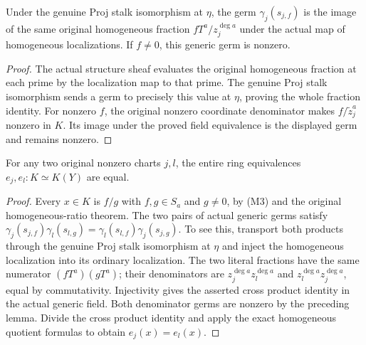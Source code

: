 \begin{lemma}
\label{lem:seven-native-original-homogeneous-stalk}
\leanok
Under the genuine Proj stalk isomorphism at $\eta$, the germ
$\gamma_j(s_{j,f})$ is the image of the same original homogeneous fraction
$fT^a/z_j^{\deg a}$ under the actual map of homogeneous localizations.
If $f\ne0$, this generic germ is nonzero.
\end{lemma}
\begin{proof}
The actual structure sheaf evaluates the original homogeneous fraction at
each prime by the localization map to that prime. The genuine Proj stalk
isomorphism sends a germ to precisely this value at $\eta$, proving the
whole fraction identity. For nonzero $f$, the original nonzero coordinate
denominator makes $f/\widetilde z_j^a$ nonzero in $K$. Its image under the
proved field equivalence is the displayed germ and remains nonzero.
\end{proof}

\begin{theorem}
\label{thm:seven-native-original-field-independent}
\leanok
For any two original nonzero charts $j,l$, the entire ring equivalences
$e_j,e_l:K\simeq K(Y)$ are equal.
\end{theorem}
\begin{proof}
Every $x\in K$ is $f/g$ with $f,g\in S_a$ and $g\ne0$, by (M3) and the
original homogeneous-ratio theorem. The two pairs of actual generic germs
satisfy
$\gamma_j(s_{j,f})\gamma_l(s_{l,g})=
\gamma_l(s_{l,f})\gamma_j(s_{j,g})$.
To see this, transport both products through the genuine Proj stalk
isomorphism at $\eta$ and inject the homogeneous localization into its
ordinary localization. The two literal fractions have the same numerator
$(fT^a)(gT^a)$; their denominators are
$z_j^{\deg a}z_l^{\deg a}$ and $z_l^{\deg a}z_j^{\deg a}$, equal by
commutativity. Injectivity gives the asserted cross product identity in
the actual generic field. Both denominator germs are nonzero by the
preceding lemma. Divide the cross product identity and apply the exact
homogeneous quotient formulas to obtain $e_j(x)=e_l(x)$.
\end{proof}

